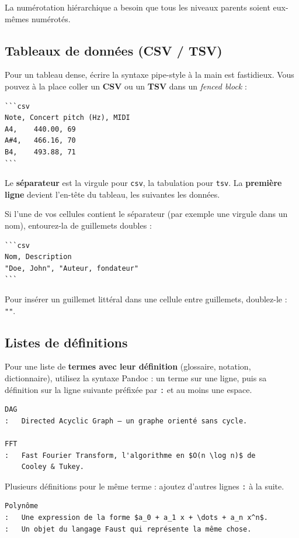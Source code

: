\documentclass[11pt,a4paper]{article}
\theoremstyle{definition}
\begin{document}
La numérotation hiérarchique a besoin que tous les niveaux parents
soient eux-mêmes numérotés.


\subsection{Tableaux de données (CSV / TSV)}

Pour un tableau dense, écrire la syntaxe pipe-style à la main est
fastidieux. Vous pouvez à la place coller un \textbf{CSV} ou un \textbf{TSV}
dans un \emph{fenced block} :


\begin{lstlisting}
```csv
Note, Concert pitch (Hz), MIDI
A4,    440.00, 69
A#4,   466.16, 70
B4,    493.88, 71
```
\end{lstlisting}


Le \textbf{séparateur} est la virgule pour \texttt{csv}, la tabulation pour \texttt{tsv}.
La \textbf{première ligne} devient l'en-tête du tableau, les suivantes les
données.


Si l'une de vos cellules contient le séparateur (par exemple une
virgule dans un nom), entourez-la de guillemets doubles :


\begin{lstlisting}
```csv
Nom, Description
"Doe, John", "Auteur, fondateur"
```
\end{lstlisting}


Pour insérer un guillemet littéral dans une cellule entre guillemets,
doublez-le : \texttt{""}.


\subsection{Listes de définitions}

Pour une liste de \textbf{termes avec leur définition} (glossaire,
notation, dictionnaire), utilisez la syntaxe Pandoc : un terme sur
une ligne, puis sa définition sur la ligne suivante préfixée par
\texttt{:} et au moins une espace.


\begin{lstlisting}
DAG
:   Directed Acyclic Graph — un graphe orienté sans cycle.

FFT
:   Fast Fourier Transform, l'algorithme en $O(n \log n)$ de
    Cooley & Tukey.
\end{lstlisting}


Plusieurs définitions pour le même terme : ajoutez d'autres lignes
\texttt{:} à la suite.


\begin{lstlisting}
Polynôme
:   Une expression de la forme $a_0 + a_1 x + \dots + a_n x^n$.
:   Un objet du langage Faust qui représente la même chose.
\end{lstlisting}
\end{document}
